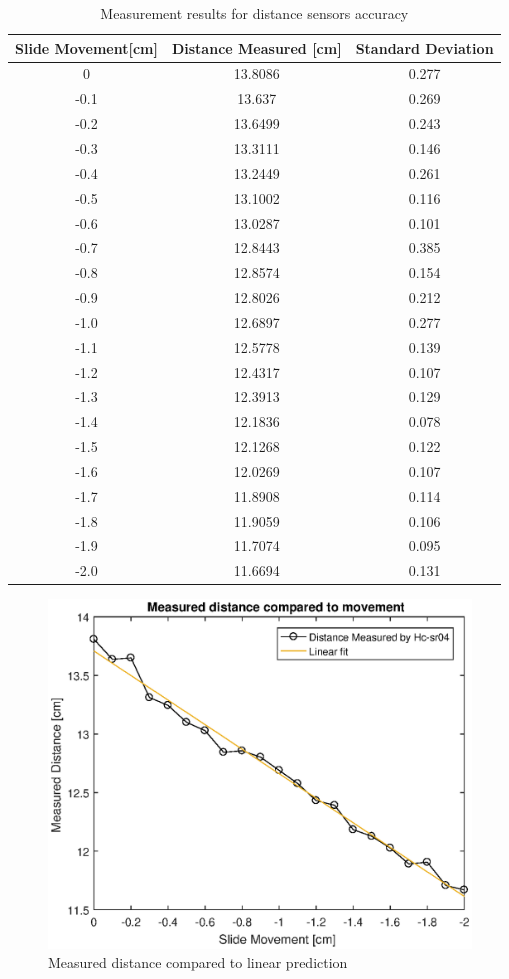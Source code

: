 \documentclass[twoside]{ctuthesis}
\theoremstyle{plain}
\theoremstyle{definition}
\theoremstyle{note}
\begin{document}
\begin{table}[H]
\centering
	\begin{tabular}{| c |c| c |}
		\hline
		Slide Movement[cm] & Distance Measured [cm] & Standard Deviation\\ \hline
		0 & 13.8086 & 0.277\\
		-0.1 & 13.637 & 0.269\\
		-0.2 & 13.6499 & 0.243\\
		-0.3 & 13.3111 & 0.146\\
		-0.4 & 13.2449 & 0.261\\
		-0.5 & 13.1002 & 0.116\\
		-0.6 & 13.0287 & 0.101\\
		-0.7 & 12.8443 & 0.385\\
		-0.8 & 12.8574 & 0.154\\
		-0.9 & 12.8026 & 0.212\\
		-1.0 & 12.6897 & 0.277\\
		-1.1 & 12.5778 & 0.139\\
		-1.2 & 12.4317 & 0.107\\
		-1.3 & 12.3913 & 0.129\\
		-1.4 & 12.1836 & 0.078\\
		-1.5 & 12.1268 & 0.122\\
		-1.6 & 12.0269 & 0.107\\
		-1.7 & 11.8908 & 0.114\\
		-1.8 & 11.9059 & 0.106\\
		-1.9 & 11.7074 & 0.095\\
		-2.0 & 11.6694 & 0.131\\
		\hline
	\end{tabular}
	\caption{Measurement results for distance sensors accuracy}
\end{table}



\begin{figure}[H]
	\centering
	\includegraphics[width = \textwidth]{DistanceMeasuringGraphAndFit2}
	\caption{Measured distance compared to linear prediction}
\end{figure}
\end{document}
